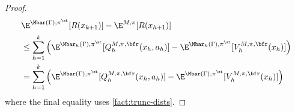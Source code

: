 \begin{proof}
\begin{align*}
&\E^{\Mbar(\Gamma),\pi^\st}[R(x_{k+1})] - \E^{M,\pi}[R(x_{h+1})] \\
&\leq \sum_{h=1}^{k} \left(\E^{\Mbar_h(\Gamma),\pi^\st}[Q^{M,\pi,\bfr}_h(x_h,a_h)] - \E^{\Mbar_h(\Gamma),\pi^\st}[V^{M,\pi,\bfr}_h(x_h)]\right) \\ 
&= \sum_{h=1}^k \left(\E^{\Mbar(\Gamma),\pi^\st}[Q^{M,\pi,\bfr}_h(x_h,a_h)] - \E^{\Mbar(\Gamma),\pi^\st}[V^{M,\pi,\bfr}_h(x_h)]\right)
\end{align*}
where the final equality uses \cref{fact:trunc-dists}.
\end{proof}
